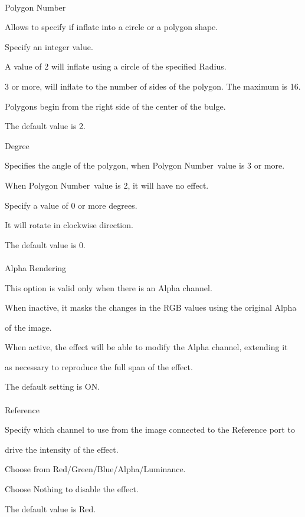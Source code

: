 \documentclass[a4paper,12pt]{article}
\begin{document}
\newpage

\thispagestyle{empty}

\ \vspace{-0.2em}
\\
Polygon Number\par
Allows to specify if inflate into a circle or a polygon shape.\par
Specify an integer value.\par
A value of 2 will inflate using a circle of the specified Radius.\par
3 or more, will inflate to the number of sides of the polygon. The maximum is 16.\par
Polygons begin from the right side of the center of the bulge.\par
The default value is 2.
\\
\par
\noindent Degree\par
Specifies the angle of the polygon, when \textquotedbl Polygon Number\textquotedbl \ value is 3 or more.\par
When \textquotedbl Polygon Number\textquotedbl \ value is 2, it will have no effect.\par
Specify a value of 0 or more degrees.\par
It will rotate in clockwise direction.\par
The default value is 0.\\
\\
Alpha Rendering\par
This option is valid only when there is an Alpha channel.\par
When inactive, it masks the changes in the RGB values using the original Alpha\par 
of the image.\par
When active, the effect will be able to modify the Alpha channel, extending it\par 
as necessary to reproduce the full span of the effect.\par
The default setting is ON.\\
\\
Reference\par
Specify which channel to use from the image connected to the Reference port to\par 
drive the intensity of the effect.\par
Choose from Red/Green/Blue/Alpha/Luminance.\par
Choose Nothing to disable the effect.\par
The default value is \textquotedbl Red\textquotedbl .
\end{document}

